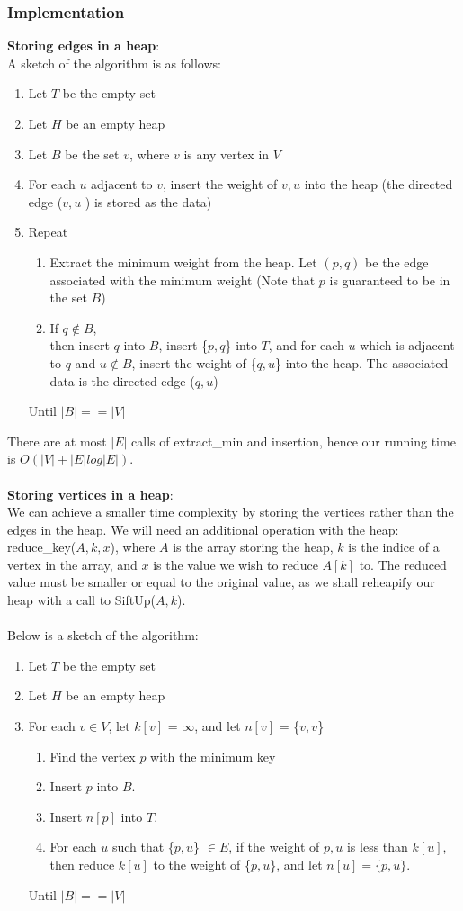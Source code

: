 \documentclass[a4paper]{article}
\begin{document}
\subsubsection{Implementation}
\textbf{Storing edges in a heap}:\\
A sketch of the algorithm is as follows:
\begin{enumerate} \itemsep0em
	\item Let $T$ be the empty set
	\item Let $H$ be an empty heap
	\item Let $B$ be the set {$v$}, where $v$ is any vertex in $V$
	\item For each $u$ adjacent to $v$, insert the weight of ${v,u}$ into the heap (the directed edge ($v,u$ ) is stored as the data)
	\item Repeat
	\begin{enumerate}
		\item Extract the minimum weight from the heap. Let $(p,q)$ be the edge associated with the minimum weight (Note that $p$ is guaranteed to be in the set $B$)
		\item If $q\notin B$, \\then insert $q$ into $B$, insert \{$p,q$\} into $T$, and for each $u$ which is adjacent to $q$ and $u\notin B$, insert the weight of \{$q,u$\} into the heap. The associated data is the directed edge ($q,u$)
	\end{enumerate}
	Until $|B| == |V|$
\end{enumerate}
There are at most $|E|$ calls of extract\_min and insertion, hence our running time is $O(|V| + |E|log|E|)$.\\\\
\textbf{Storing vertices in a heap}:\\
We can achieve a smaller time complexity by storing the vertices rather than the edges in the heap. We will need an additional operation with the heap: reduce\_key($A, k, x$), where $A$ is the array storing the heap, $k$ is the indice of a vertex in the array, and $x$ is the value we wish to reduce $A[k]$ to. The reduced value must be smaller or equal to the original value, as we shall reheapify our heap with a call to SiftUp($A, k$).\\\\
Below is a sketch of the algorithm:
\begin{enumerate} \itemsep0em
	\item Let $T$ be the empty set
	\item Let $H$ be an empty heap
	\item For each $v\in V$, let $k[v]$ = $\infty$, and let $n[v]$ = \{$v,v$\}
	\begin{enumerate}
		\item Find the vertex $p$ with the minimum key
		\item Insert $p$ into $B$.
		\item Insert $n[p]$ into $T$.
		\item For each $u$ such that \{$p,u$\} $\in E$,
		if the weight of {$p,u$ is less than $k[u]$}, then reduce $k[u]$ to the weight of \{$p,u$\}, and let $n[u] = \{p,u\}$.
	\end{enumerate}
	Until $|B| == |V|$
\end{enumerate}
\end{document}
